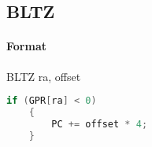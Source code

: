 \subsection{BLTZ}


\paragraph{Format} BLTZ ra, offset

\begin{lstlisting}[language=c]
    if (GPR[ra] < 0)
    {
        PC += offset * 4;
    }
\end{lstlisting}
